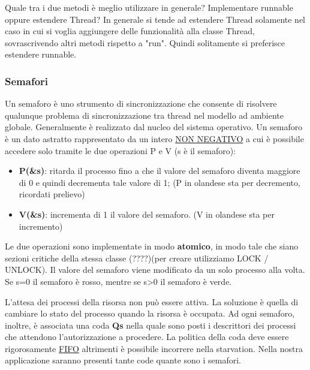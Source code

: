 \documentclass{article}
\begin{document}
\noindent Quale tra i due metodi è meglio utilizzare in generale? Implementare runnable oppure estendere Thread? In generale si tende ad estendere Thread solamente nel caso 
in cui si voglia aggiungere delle funzionalità alla classe Thread, sovrascrivendo altri metodi rispetto a "run". Quindi solitamente si preferisce estendere runnable.

\subsubsection{Semafori}
\noindent Un semaforo è uno strumento di sincronizzazione che consente di risolvere qualunque problema di sincronizzazione tra thread
nel modello ad ambiente globale. Generalmente è realizzato dal nucleo del sistema operativo. Un semaforo è un dato astratto rappresentato
da un intero \underline{NON NEGATIVO} a cui è possibile accedere solo tramite le due operazioni P e V (s è il semaforo):
\begin{itemize}
    \item \textbf{P(\&s)}: ritarda il processo fino a che il valore del semaforo diventa maggiore di 0 e quindi decrementa tale valore di 1;
    (P in olandese sta per decremento, ricordati prelievo)
    \item \textbf{V(\&s)}: incrementa di 1 il valore del semaforo. (V in olandese sta per incremento)
\end{itemize}

\noindent Le due operazioni sono implementate in modo \textbf{atomico}, in modo tale che siano sezioni 
critiche della stessa classe (????)(per creare utilizziamo LOCK / UNLOCK).
Il valore del semaforo viene modificato da un solo processo alla volta. Se s=0 il semaforo è rosso, mentre se s>0 il semaforo è verde.
\medskip

\noindent L'attesa dei processi della risorsa non può essere attiva. La soluzione è quella di cambiare lo stato del processo quando la
 risorsa è occupata. 
Ad ogni semaforo, inoltre, è associata una coda \textbf{Qs} nella quale sono posti i descrittori dei processi che attendono 
l'autorizzazione a procedere. La politica della coda deve essere rigorosamente \underline{FIFO} altrimenti è possibile incorrere nella starvation.
Nella nostra applicazione saranno presenti tante code quante sono i semafori.
\medskip
\end{document}
